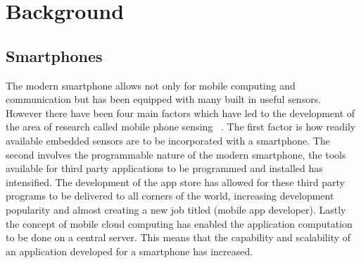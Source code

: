\chapter{Background} %
\label{cha:chapter_background}


\section{Smartphones} %
\label{sec:section_smartphones}
The modern smartphone allows not only for mobile computing and communication but has been equipped with many built in useful sensors. However there have been four main factors which have led to the development of the area of research called mobile phone sensing~\cite{Campbell2010sensing} . The first factor is how readily available embedded sensors are to be incorporated with a smartphone. The second involves the programmable nature of the modern smartphone, the tools available for third party applications to be programmed and installed has intensified. The development of the app store has allowed for these third party programs to be delivered to all corners of the world, increasing development popularity and almost creating a new job titled (mobile app developer). Lastly the concept of mobile cloud computing has enabled the application computation to be done on a central server. This means that the capability and scalability of an application developed for a smartphone has increased. 


